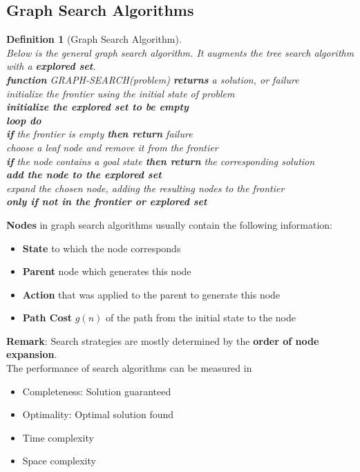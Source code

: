 \documentclass[12pt]{article}
\newcommand{\ind}{\hspace*{15pt}}
\newtheorem{definition}{Definition}[section]
\theoremstyle{definition}
\begin{document}
\subsection{Graph Search Algorithms}
\begin{definition}[Graph Search Algorithm]
\hfill\\\normalfont Below is the general graph search algorithm. It augments the tree search algorithm with a \textbf{explored set}.\\
\textbf{function} \textsc{GRAPH-SEARCH}(\textit{problem}) \textbf{returns} a solution, or failure\\
\ind initialize the frontier using the initial state of \textit{problem}\\
\ind \textbf{initialize the explored set to be empty}\\
\ind \textbf{loop do}\\
\ind \ind \textbf{if} the frontier is empty \textbf{then return} failure\\
\ind \ind choose a leaf node and remove it from the frontier\\
\ind \ind \textbf{if} the node contains a goal state \textbf{then return} the corresponding solution\\
\ind \ind \textbf{add the node to the explored set}\\
\ind \ind expand the chosen node, adding the resulting nodes to the frontier\\
\ind \ind \ind \textbf{only if not in the frontier or explored set}
\end{definition}
\textbf{Nodes} in graph search algorithms usually contain the following information:
\begin{itemize}
	\item \textbf{State} to which the node corresponds
	\item \textbf{Parent} node which generates this node
	\item \textbf{Action} that was applied to the parent to generate this node
	\item \textbf{Path Cost} $g(n)$ of the path from the initial state to the node
\end{itemize}
\textbf{Remark}: Search strategies are mostly determined by the \textbf{order of node expansion}.\\
The performance of search algorithms can be measured in
\begin{itemize}
\item Completeness: Solution guaranteed
\item Optimality: Optimal solution found
\item Time complexity
\item Space complexity
\end{itemize}
\end{document}
